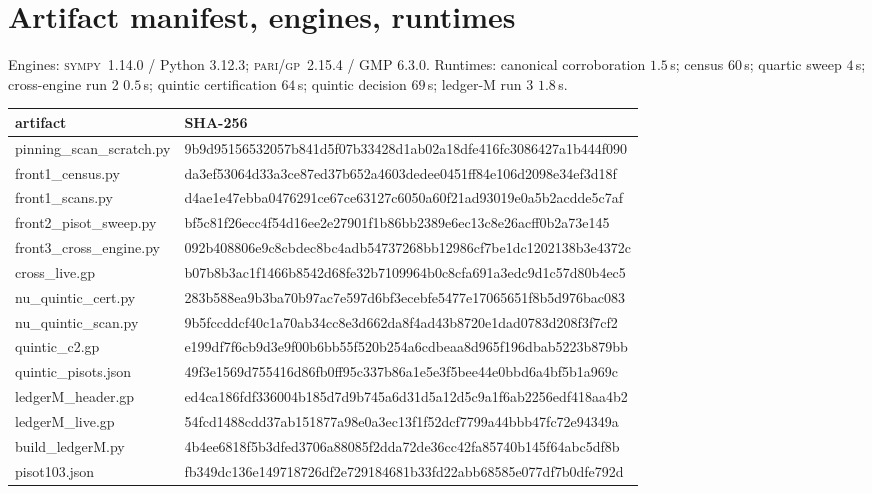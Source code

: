 \documentclass[11pt]{article}
\newcommand{\gp}{\textsc{pari/gp}}
\newcommand{\sy}{\textsc{sympy}}
\theoremstyle{definition}
\begin{document}
\appendix

\section{Artifact manifest, engines, runtimes}\label{app:manifest}

Engines: \sy~1.14.0 / Python 3.12.3; \gp~2.15.4 / GMP 6.3.0. Runtimes:
canonical corroboration $1.5$\,s; census $60$\,s; quartic sweep $4$\,s;
cross-engine run 2 $0.5$\,s; quintic certification $64$\,s; quintic decision
$69$\,s; ledger-M run 3 $1.8$\,s.

\begin{center}
\scriptsize\ttfamily
\begin{tabular}{ll}
\hline
artifact & SHA-256\\
\hline
pinning\_scan\_scratch.py & 9b9d95156532057b841d5f07b33428d1ab02a18dfe416fc3086427a1b444f090\\
front1\_census.py & da3ef53064d33a3ce87ed37b652a4603dedee0451ff84e106d2098e34ef3d18f\\
front1\_scans.py & d4ae1e47ebba0476291ce67ce63127c6050a60f21ad93019e0a5b2acdde5c7af\\
front2\_pisot\_sweep.py & bf5c81f26ecc4f54d16ee2e27901f1b86bb2389e6ec13c8e26acff0b2a73e145\\
front3\_cross\_engine.py & 092b408806e9c8cbdec8bc4adb54737268bb12986cf7be1dc1202138b3e4372c\\
cross\_live.gp & b07b8b3ac1f1466b8542d68fe32b7109964b0c8cfa691a3edc9d1c57d80b4ec5\\
nu\_quintic\_cert.py & 283b588ea9b3ba70b97ac7e597d6bf3ecebfe5477e17065651f8b5d976bac083\\
nu\_quintic\_scan.py & 9b5fccddcf40c1a70ab34cc8e3d662da8f4ad43b8720e1dad0783d208f3f7cf2\\
quintic\_c2.gp & e199df7f6cb9d3e9f00b6bb55f520b254a6cdbeaa8d965f196dbab5223b879bb\\
quintic\_pisots.json & 49f3e1569d755416d86fb0ff95c337b86a1e5e3f5bee44e0bbd6a4bf5b1a969c\\
ledgerM\_header.gp & ed4ca186fdf336004b185d7d9b745a6d31d5a12d5c9a1f6ab2256edf418aa4b2\\
ledgerM\_live.gp & 54fcd1488cdd37ab151877a98e0a3ec13f1f52dcf7799a44bbb47fc72e94349a\\
build\_ledgerM.py & 4b4ee6818f5b3dfed3706a88085f2dda72de36cc42fa85740b145f64abc5df8b\\
pisot103.json & fb349dc136e149718726df2e729184681b33fd22abb68585e077df7b0dfe792d\\
\hline
\end{tabular}
\end{center}
\end{document}

